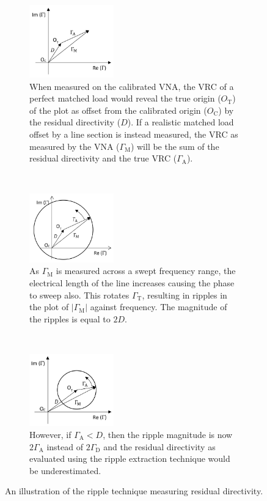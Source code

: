 \documentclass[../thesis/thesis.tex]{subfiles}
\begin{document}
\begin{refsection}
\begin{figure}
	\centering
	\begin{subfigure}{\textwidth}
		\centering
		\includegraphics[width=0.4\textwidth]{Ripple1.png}
		\caption{When measured on the calibrated VNA, the VRC of a perfect matched load would reveal the true origin ($O_\textrm{T}$) of the plot as offset from the calibrated origin ($O_\textrm{C}$) by the residual directivity ($D$). If a realistic matched load offset by a line section is instead measured, the VRC as measured by the VNA ($\Gamma_\textrm{M}$) will be the sum of the residual directivity and the true VRC ($\Gamma_\textrm{A}$). }
	\end{subfigure}
	\\
	\begin{subfigure}{\textwidth}
		\centering
		\includegraphics[width=0.4\textwidth]{Ripple2.png}
		\caption{As $\Gamma_\textrm{M}$ is measured across a swept frequency range, the electrical length of the line increases causing the phase to sweep also. This rotates $\Gamma_\textrm{T}$, resulting in ripples in the plot of $|\Gamma_\textrm{M}|$ against frequency. The magnitude of the ripples is equal to $2D$. }
	\end{subfigure}
	\\
	\begin{subfigure}{\textwidth}
		\centering
		\includegraphics[width=0.4\textwidth]{Ripple3.png}
		\caption{However, if $\Gamma_\textrm{A} < D$, then the ripple magnitude is now $2\Gamma_\textrm{A}$ instead of $2\Gamma_\textrm{D}$ and the residual directivity as evaluated using the ripple extraction technique would be underestimated.}
	\end{subfigure}
	\caption{An illustration of the ripple technique measuring residual directivity.}
	\label{ch4_fig_ripple1}
\end{figure}


\end{refsection}
\end{document}
